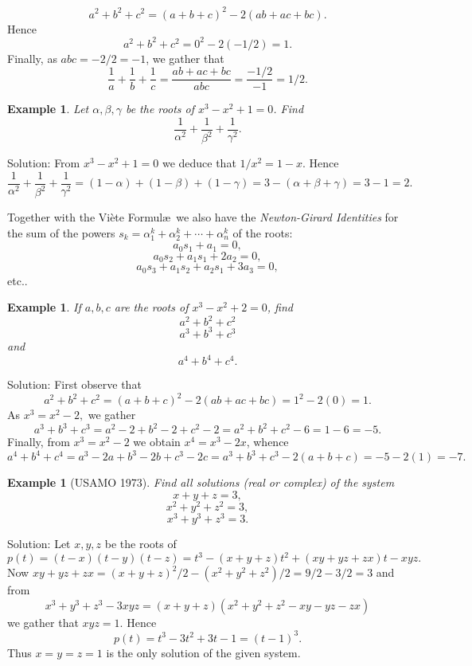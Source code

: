 \documentclass[11pt, openany]{book}
\theoremstyle{change} \theoremheaderfont{\blue\sffamily\bfseries}
\newtheorem{exa}[thm]{Example}
\theoremstyle{nonumberplain} \theoremheaderfont{\sffamily\bfseries}
\newcommand{\í}{\'{\i}}
\begin{document}
$$a^2 + b^2 + c^2 = (a + b + c)^2 - 2(ab + ac + bc).$$
Hence
$$a^2 + b^2 + c^2 = 0^2 - 2(-1/2) = 1.$$
Finally, as $abc = -2/2 = -1$, we gather that
$$\frac{1}{a} + \frac{1}{b}+ \frac{1}{c} = \frac{ab + ac + bc}{abc} = \frac{-1/2}{-1} = 1/2.$$
\begin{exa}
Let $\alpha , \beta , \gamma$ be the roots of $x^3 - x^2 + 1 = 0$.
Find
$$\frac{1}{\alpha ^2} + \frac{1}{\beta ^2} + \frac{1}{\gamma ^2}.$$
\end{exa}

Solution: From $x^3 - x^2 + 1 = 0$ we deduce that $1/x^2 = 1  -
x$. Hence
$$
\frac{1}{\alpha ^2} + \frac{1}{\beta ^2} + \frac{1}{\gamma ^2} =
(1 - \alpha) + (1 - \beta) + (1 - \gamma) = 3 - (\alpha + \beta +
\gamma) = 3 - 1 = 2. $$


\bigskip


Together with the Vi\`{e}te Formul\ae \ we also have the {\em
Newton-Girard Identities} for the sum of the powers $s_k = \alpha _1
^k + \alpha _2 ^k + \cdots + \alpha _n ^k$ of the roots:
$$a_0s_1 + a_1 = 0,$$
$$a_0s_2 + a_1s_1 + 2a_2 = 0,$$
$$a_0s_3 + a_1s_2 + a_2s_1 + 3a_3 = 0,$$etc..
\begin{exa}If  $a, b , c$ are the roots of $x^3 - x^2 + 2 = 0$, find
$$a^2 + b^2 + c^2$$
$$a^3 + b^3 + c^3$$ and  $$a^4 + b^4 + c^4.$$\end{exa}
Solution: First observe that
$$a^2 + b^2 + c^2 = (a + b + c)^2 - 2(ab + ac + bc) = 1^2 - 2(0) = 1.$$
As $x^3 = x^2 - 2,$ we gather
$$a^3 + b^3 + c^3 = a^2 - 2 + b^2 - 2 + c^2 - 2 = a^2 + b^2 + c^2 - 6 = 1 - 6 = -5. $$
Finally, from $x^3 = x^2 - 2$ we obtain $x^4 = x^3 - 2x$, whence
$$a^4 + b^4 + c^4 = a^3 - 2a + b^3 - 2b + c^3 - 2c = a^3 + b^3 + c^3 - 2(a + b + c) = -5 - 2(1) = -7.$$
\begin{exa}[USAMO 1973] Find all solutions (real or complex) of the system
$$ x + y + z = 3,$$
$$x^2 + y^2 + z^2 = 3,$$
$$x^3 + y^3 + z^3 = 3.$$

\end{exa}
Solution: Let $x, y , z$ be the roots of
$$p(t) = (t - x)(t - y)(t - z) = t^3 - (x + y + z)t^2 + (xy + yz + zx)t - xyz.$$
Now $xy + yz + zx = (x + y + z)^2/2 - (x^2 + y^2 + z^2)/2 = 9/2 -
3/2 = 3$ and from
$$x^3 + y^3 + z^3 - 3xyz = (x + y + z)(x^2 + y^2 + z^2 - xy - yz - zx)$$ we gather that
 $xyz = 1.$ Hence
$$p(t) = t^3 - 3t^2 + 3t - 1 = (t - 1)^3.$$
Thus $x = y = z = 1$ is the only solution of the given system.

\clearpage
\end{document}
